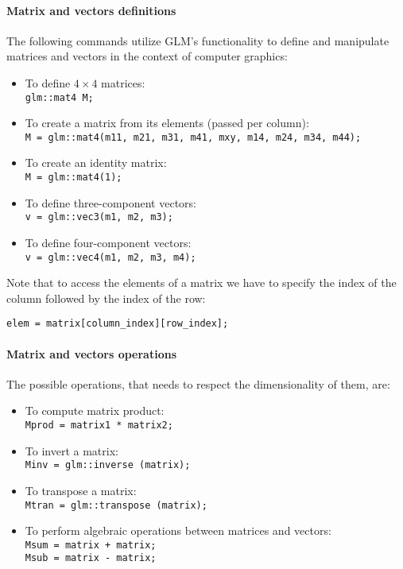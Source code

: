 \paragraph*{Matrix and vectors definitions}
The following commands utilize GLM's functionality to define and manipulate matrices and vectors in the context of computer graphics:
\begin{itemize}
    \item To define $4 \times 4$ matrices: \\
        \texttt{glm::mat4 M;}
    \item To create a matrix from its elements (passed per column): \\
        \texttt{M = glm::mat4(m11, m21, m31, m41, mxy, m14, m24, m34, m44);}
    \item To create an identity matrix: \\
        \texttt{M = glm::mat4(1);}
    \item To define three-component vectors: \\
        \texttt{v = glm::vec3(m1, m2, m3);}
    \item To define four-component vectors: \\
        \texttt{v = glm::vec4(m1, m2, m3, m4);} 
\end{itemize}
Note that to access the elements of a matrix we have to specify the index of the column followed by the index of the row: 
\begin{verbatim}
elem = matrix[column_index][row_index];
\end{verbatim}

\paragraph*{Matrix and vectors operations}
The possible operations, that needs to respect the dimensionality of them, are: 
\begin{itemize}
    \item To compute matrix product: \\ 
        \texttt{Mprod = matrix1 * matrix2;}
    \item To invert a matrix: \\ 
        \texttt{Minv = glm::inverse (matrix);}
    \item To transpose a matrix: \\ 
        \texttt{Mtran = glm::transpose (matrix);}
    \item To perform algebraic operations between matrices and vectors: \\ 
        \texttt{Msum = matrix + matrix;} \\
        \texttt{Msub = matrix - matrix;} 
\end{itemize}

